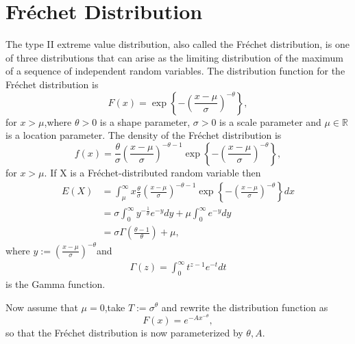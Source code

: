 \section*{Fréchet Distribution}
\label{sec:frechet}

The type II extreme value distribution, also called the Fréchet distribution, is one of three distributions that can arise as the limiting distribution of the maximum of a sequence of independent random variables. The distribution function for the Fréchet distribution is
\[
F(x)=\exp\left\{-\left(\frac{x-\mu}{\sigma}\right)^{-\theta}\right\},
\]
for $x>\mu$,where $\theta>0$ is a shape parameter, $\sigma>0$ is a scale parameter and $\mu\in\mathbb{R}$ is a
location parameter. The density of the Fréchet distribution is
\[
f(x)=\dfrac{\theta}{\sigma}\left(\dfrac{x-\mu}{\sigma}\right)^{-\theta-1}\exp\left\{-\left(\dfrac{x-\mu}{\sigma}\right)^{-\theta}\right\},
\]
for $x>\mu.$ If X is a Fréchet-distributed random variable then
\begin{align*}
    E(X)&=\int_{\mu}^{\infty}x\frac{\theta}{\sigma}\left(\frac{x-\mu}{\sigma}\right)^{-\theta-1}\exp\left\{-\left(\frac{x-\mu}{\sigma}\right)^{-\theta}\right\}dx\\
    &=\sigma\int_0^\infty y^{-\frac1\theta}e^{-y}dy+\mu\int_0^\infty e^{-y}dy\\&=\sigma\Gamma\left(\frac{\theta-1}\theta\right)+\mu,
\end{align*}
where $y:=\left(\frac{x-\mu}{\sigma}\right)^{-\theta}$and
\begin{align*}
    \Gamma(z)=\int_0^\infty t^{z-1}e^{-t}dt
\end{align*}
is the Gamma function. 

Now assume that $\mu=0$,take $T:=\sigma^\theta$ and rewrite the distribution
function as
\[
F(x)=e^{-Ax^{-\theta}},
\]
so that the Fréchet distribution is now parameterized by $\theta,A.$